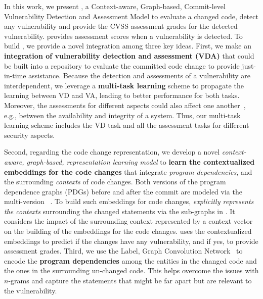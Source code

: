 In this work, we present {\tool}, a Context-aware, Graph-based,
Commit-level Vulnerability Detection and Assessment Model to evaluate
a changed code, detect any vulnerability and provide the CVSS
assessment grades for the detected vulnerability. {\tool} provides
assessment scores when a vulnerability is detected. To build {\tool},
we provide a novel integration among three key ideas. First, we make
an {\bf integration of vulnerability detection and assessment (VDA)}
that could be built into a repository to evaluate the committed code
change to provide just-in-time assistance. Because the detection and
assessments of a vulnerability are interdependent, we leverage a {\bf
  multi-task learning} scheme to propagate the learning between VD and
VA, leading to better performance for both tasks. Moreover, the
assessments for different aspects could also affect one
another~\cite{deepCVA-ase21}, e.g., between the availability and
integrity of a system. Thus, our multi-task learning scheme includes
the VD task and all the assessment tasks for different security
aspects.

Second, regarding the code change representation, we develop a novel
{\em context-aware, graph-based, representation learning model} to
{\bf learn the contextualized embeddings for the code changes} that
integrate {\em program dependencies}, and the surrounding {\em
  contexts} of code changes.  Both versions of the program dependence
graphs (PDGs) before and after the commit are modeled via the
multi-version {\mvpdg}~\cite{flexeme-fse20}. To build such embeddings
for code changes, {\tool} {\em explicitly represents the contexts}
surrounding the changed statements via the sub-graphs in {\mvpdg}. It
considers the impact of the surrounding context represented by a
context vector on the building of the embeddings for the code
changes. {\tool} uses the contextualized embeddings to predict if the
changes have any vulnerability, and if yes, to provide assessment
grades. Third, we use the Label, Graph Convolution
Network~\cite{label-gcn} to encode the {\bf program dependencies}
among the entities in the changed code and the ones in the surrounding
un-changed code. This helps overcome the issues with $n$-grams and
capture the statements that might be far apart but are relevant to the
vulnerability.

